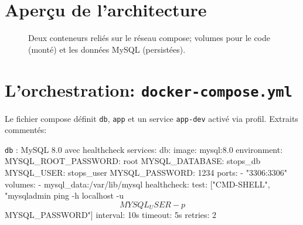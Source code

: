 \section{Aperçu de l'architecture}

\begin{figure}[H]
  \centering
  \caption{Deux conteneurs reliés sur le réseau compose; volumes pour le code (monté) et les données MySQL (persistées).}
\end{figure}

\section{L'orchestration: \texttt{docker-compose.yml}}

Le fichier compose définit \texttt{db}, \texttt{app} et un service \texttt{app-dev} activé via profil. Extraits commentés:

\begin{codebox}[language=yaml]{\texttt{db} : MySQL 8.0 avec healthcheck}
services:
  db:
    image: mysql:8.0
    environment:
      MYSQL_ROOT_PASSWORD: root
      MYSQL_DATABASE: stops_db
      MYSQL_USER: stops_user
      MYSQL_PASSWORD: 1234
    ports:
      - "3306:3306"
    volumes:
      - mysql_data:/var/lib/mysql
    healthcheck:
      test: ["CMD-SHELL", "mysqladmin ping -h localhost -u$${MYSQL_USER} -p$${MYSQL_PASSWORD}"]
      interval: 10s
      timeout: 5s
      retries: 2
\end{codebox}

